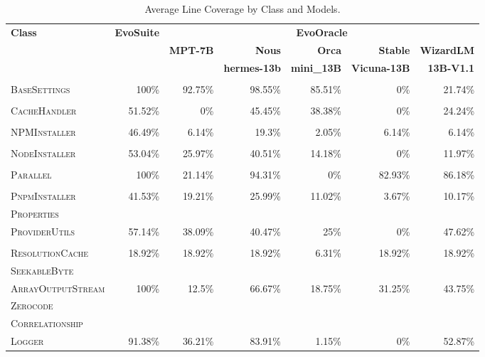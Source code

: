 \begin{table}[H]
\centering

\begin{tabular}{| l | r | r | r | r | r | r |}
\hline
\multirow{2}{*}{\textbf{Class}} & \multirow{2}{*}{\textbf{EvoSuite}} & \multicolumn{5}{c|}{\textbf{EvoOracle}} \\ %
\cline{3-7} %
 &  & \textbf{MPT-7B} & \textbf{Nous} & \textbf{Orca} & \textbf{Stable} & \textbf{WizardLM} \\
 &  &  & \textbf{hermes-13b} & \textbf{mini\_13B} & \textbf{Vicuna-13B} & \textbf{13B-V1.1} \\
\hline
\scriptsize\textsc{} &  &  &  &  &  &  \\
\scriptsize\textsc{BaseSettings} & 100\% & 92.75\% & 98.55\% & 85.51\% & 0\% & 21.74\% \\
\hline
\scriptsize\textsc{} &  &  &  &  &  &  \\
\scriptsize\textsc{CacheHandler} & 51.52\% & 0\% & 45.45\% & 38.38\% & 0\% & 24.24\% \\
\hline
\scriptsize\textsc{} &  &  &  &  &  &  \\
\scriptsize\textsc{NPMInstaller} & 46.49\% & 6.14\% & 19.3\% & 2.05\% & 6.14\% & 6.14\% \\
\hline
\scriptsize\textsc{} &  &  &  &  &  &  \\
\scriptsize\textsc{NodeInstaller} & 53.04\% & 25.97\% & 40.51\% & 14.18\% & 0\% & 11.97\% \\
\hline
\scriptsize\textsc{} &  &  &  &  &  &  \\
\scriptsize\textsc{Parallel} & 100\% & 21.14\% & 94.31\% & 0\% & 82.93\% & 86.18\% \\
\hline
\scriptsize\textsc{} &  &  &  &  &  &  \\
\scriptsize\textsc{PnpmInstaller} & 41.53\% & 19.21\% & 25.99\% & 11.02\% & 3.67\% & 10.17\% \\
\hline
\scriptsize\textsc{Properties} &  &  &  &  &  &  \\
\scriptsize\textsc{ProviderUtils} & 57.14\% & 38.09\% & 40.47\% & 25\% & 0\% & 47.62\% \\
\hline
\scriptsize\textsc{} &  &  &  &  &  &  \\
\scriptsize\textsc{ResolutionCache} & 18.92\% & 18.92\% & 18.92\% & 6.31\% & 18.92\% & 18.92\% \\
\hline
\scriptsize\textsc{SeekableByte} &  &  &  &  &  &  \\
\scriptsize\textsc{ArrayOutputStream} & 100\% & 12.5\% & 66.67\% & 18.75\% & 31.25\% & 43.75\% \\
\hline
\scriptsize\textsc{Zerocode} &  &  &  &  &  &  \\
\scriptsize\textsc{Correlationship} &  &  &  &  &  &  \\
\scriptsize\textsc{Logger} & 91.38\% & 36.21\% & 83.91\% & 1.15\% & 0\% & 52.87\% \\
\hline

\end{tabular}
\caption{Average Line Coverage by Class and Models.}
\label{tab:line_coverage}
\end{table}

